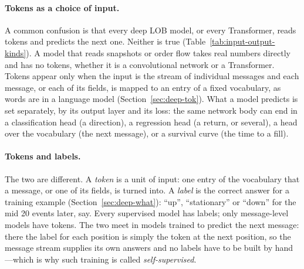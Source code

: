 \paragraph{Tokens as a choice of input.} A common confusion is that every deep LOB model, or
every Transformer, reads tokens and predicts the next one. Neither is true (Table~\ref{tab:input-output-kinds}). A
model that reads snapshots or order flow takes real numbers directly and has no tokens, whether it is a
convolutional network or a Transformer. Tokens appear only when the input is the stream of individual messages and
each message, or each of its fields, is mapped to an entry of a fixed vocabulary, as words are in a language model
(Section~\ref{sec:deep-tok}). What a model predicts is set separately, by its output layer and its loss: the same
network body can end in a classification head (a direction), a regression head (a return, or several), a head over
the vocabulary (the next message), or a survival curve (the time to a fill).

\paragraph{Tokens and labels.} The two are different. A \emph{token} is a unit of input: one entry of the vocabulary
that a message, or one of its fields, is turned into. A \emph{label} is the correct answer for a training example
(Section~\ref{sec:deep-what}): ``up'', ``stationary'' or ``down'' for the mid 20 events later, say. Every supervised
model has labels; only message-level models have tokens. The two meet in models trained to predict the next message:
there the label for each position is simply the token at the next position, so the message stream supplies its own
answers and no labels have to be built by hand---which is why such training is called \emph{self-supervised}.

